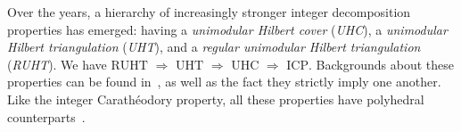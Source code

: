 \documentclass[11pt,a4paper]{amsart}
\renewcommand*{\geq}{\geqslant}
\renewcommand*{\leq}{\leqslant}
\theoremstyle{plain}
\theoremstyle{definition}
\newcommand{\R}{\mathbb{R}}
\newcommand{\Q}{\mathbb{Q}}
\DeclareMathOperator{\cone}{cone}
\def\checkmark{\tikz\fill[scale=0.4](0,.35) -- (.25,0) -- (1,.7) -- (.25,.15) -- cycle;}
\def\faCrossed{$\times$}
\begin{document}
Over the years, a hierarchy of increasingly stronger integer decomposition properties has emerged: having a \emph{unimodular Hilbert cover} (\emph{UHC}), a \emph{unimodular Hilbert triangulation} (\emph{UHT}), and a \emph{regular unimodular Hilbert triangulation} (\emph{RUHT}).
We have $\text{RUHT } \Longrightarrow\text{ UHT }\Longrightarrow\text{ UHC }\Longrightarrow \text{ ICP}$.
Backgrounds about these properties can be found in~\cite{Firla_Ziegler_1999,Bruns_Gubeladze_Henk_Martin_Weismantel_1999,Bruns_Gubeladze_2002,Bruns_2007,Gijswijt_Regts_2012}, as well as the fact they strictly imply one another.
Like the integer Carath\'eodory property, all these properties have polyhedral counterparts~\cite[Section~1.2.5]{Haase_Paffenholz_Piechnik_Santos_2021}.

\end{document}
